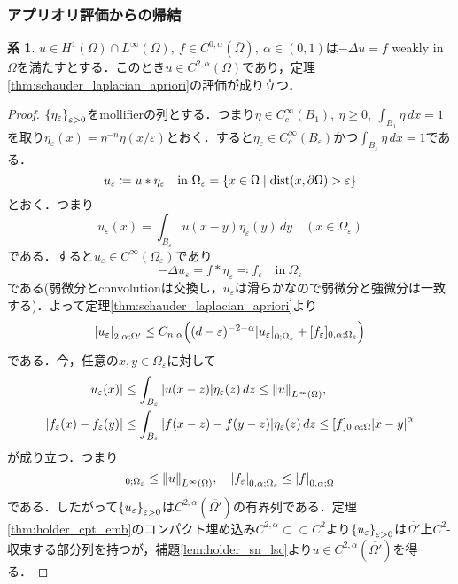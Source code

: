 \documentclass[a4paper]{ltjsarticle}
\newcommand{\Om}{\Omega}
\newcommand{\pOm}{\partial\Omega}
\newcommand{\Ombar}{\overline{\Omega}}
\newcommand{\ssubset}{\subset\subset}
\newcommand{\inn}{\quad\text{in}\ }
\newcommand{\1}{\mathbbm{1}}
\DeclareMathOperator{\dist}{\mathrm{dist}}
\numberwithin{equation}{section}
\theoremstyle{definition}
\newtheorem{cor}[thm]{系}
\begin{document}
\subsubsection{アプリオリ評価からの帰結}
\begin{cor}\label{cor:schauder}
    $u\in H^1(\Om)\cap L^\infty(\Om),\ f\in C^{0,\alpha}(\Ombar),\ \alpha\in (0,1)$は$-\Delta u=f$ weakly in $\Om$を満たすとする．このとき$u\in C^{2,\alpha}(\Om)$であり，定理\ref{thm:schauder_laplacian_apriori}の評価が成り立つ．
\end{cor}
\begin{proof}
    $\qty{\eta_\varepsilon}_{\varepsilon>0}$をmollifierの列とする．つまり$\eta\in C_c^\infty(B_1),\ \eta\geq0,\ \int_{B_1}\eta\,dx=1$を取り$\eta_\varepsilon(x)=\eta^{-n}\eta(x/\varepsilon)$とおく．すると$\eta_\varepsilon\in C_c^\infty(B_\varepsilon)$かつ$\int_{B_\varepsilon}\eta\,dx=1$である．
    \begin{equation}
        u_\varepsilon\coloneqq u\ast \eta_\varepsilon\inn \Om_\varepsilon=\qty{x\in \Om\mid\dist(x,\pOm)>\varepsilon}
    \end{equation}
    とおく．つまり
    \begin{equation}
        u_{\varepsilon}(x)=\int_{B_{\varepsilon}}u(x-y)\eta_{\varepsilon}(y)\,dy\quad (x\in \Om_{\varepsilon})
    \end{equation}
    である．すると$u_\varepsilon\in C^\infty(\Om_\varepsilon)$であり
    \begin{equation}
        -\Delta u_{\varepsilon}=f\ast \eta_{\varepsilon}\eqqcolon f_{\varepsilon}\inn \Om_{\varepsilon}
    \end{equation}
    である(弱微分とconvolutionは交換し，$u_{\varepsilon}$は滑らかなので弱微分と強微分は一致する)．よって定理\ref{thm:schauder_laplacian_apriori}より
    \begin{equation}
        \abs{u_{\varepsilon}}_{2,\alpha;\Om'}\leq C_{n,\alpha}\qty((d-\varepsilon)^{-2-\alpha}\abs{u_{\varepsilon}}_{0;\Om_{\varepsilon}}+[f_{\varepsilon}]_{0,\alpha;\Om_{\varepsilon}})\label{eq:laplacian_schauder_cor}
    \end{equation}
    である．今，任意の$x,y\in \Om_{\varepsilon}$に対して
    \begin{align}
        \abs{u_{\varepsilon}(x)}&\leq \int_{B_{\varepsilon}}\abs{u(x-z)}\eta_{\varepsilon}(z)\,dz\leq \norm{u}_{L^\infty(\Om)},\\
        \abs{f_\varepsilon(x)-f_{\varepsilon}(y)}&\leq \int_{B_{\varepsilon}}\abs{f(x-z)-f(y-z)}\eta_{\varepsilon}(z)\,dz \leq [f]_{0,\alpha;\Om}\abs{x-y}^{\alpha}
    \end{align}
    が成り立つ．つまり
    \begin{equation}
        [u_{\varepsilon}]_{0;\Om_{\varepsilon}}\leq \norm{u}_{L^\infty(\Om)},\quad \abs{f_{\varepsilon}}_{0,\alpha;\Om_\varepsilon}\leq \abs{f}_{0,\alpha;\Om} 
    \end{equation}
    である．したがって$\qty{u_{\varepsilon}}_{\varepsilon>0}$は$C^{2,\alpha}(\overline{\Om'})$の有界列である．定理\ref{thm:holder_cpt_emb}のコンパクト埋め込み$C^{2,\alpha}\ssubset C^{2}$より$\qty{u_{\varepsilon}}_{\varepsilon>0}$は$\overline{\Om'}$上$C^2$-収束する部分列を持つが，補題\ref{lem:holder_sn_lsc}より$u\in C^{2,\alpha}(\overline{\Om'})$を得る．
\end{proof}
\end{document}
